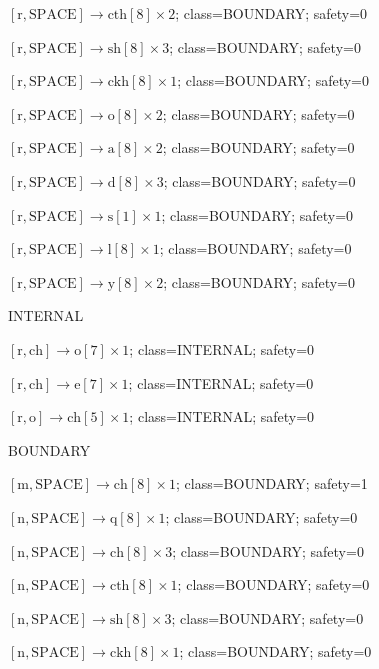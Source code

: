 \(\left[\mathrm{r}, \mathrm{SPACE}\right] \to \mathrm{cth}[8] \times 2\); class=BOUNDARY; safety=0\par
\(\left[\mathrm{r}, \mathrm{SPACE}\right] \to \mathrm{sh}[8] \times 3\); class=BOUNDARY; safety=0\par
\(\left[\mathrm{r}, \mathrm{SPACE}\right] \to \mathrm{ckh}[8] \times 1\); class=BOUNDARY; safety=0\par
\(\left[\mathrm{r}, \mathrm{SPACE}\right] \to \mathrm{o}[8] \times 2\); class=BOUNDARY; safety=0\par
\(\left[\mathrm{r}, \mathrm{SPACE}\right] \to \mathrm{a}[8] \times 2\); class=BOUNDARY; safety=0\par
\(\left[\mathrm{r}, \mathrm{SPACE}\right] \to \mathrm{d}[8] \times 3\); class=BOUNDARY; safety=0\par
\(\left[\mathrm{r}, \mathrm{SPACE}\right] \to \mathrm{s}[1] \times 1\); class=BOUNDARY; safety=0\par
\(\left[\mathrm{r}, \mathrm{SPACE}\right] \to \mathrm{l}[8] \times 1\); class=BOUNDARY; safety=0\par
\(\left[\mathrm{r}, \mathrm{SPACE}\right] \to \mathrm{y}[8] \times 2\); class=BOUNDARY; safety=0\par
INTERNAL\par
\(\left[\mathrm{r}, \mathrm{ch}\right] \to \mathrm{o}[7] \times 1\); class=INTERNAL; safety=0\par
\(\left[\mathrm{r}, \mathrm{ch}\right] \to \mathrm{e}[7] \times 1\); class=INTERNAL; safety=0\par
\(\left[\mathrm{r}, \mathrm{o}\right] \to \mathrm{ch}[5] \times 1\); class=INTERNAL; safety=0\par
BOUNDARY\par
\(\left[\mathrm{m}, \mathrm{SPACE}\right] \to \mathrm{ch}[8] \times 1\); class=BOUNDARY; safety=1\par
\(\left[\mathrm{n}, \mathrm{SPACE}\right] \to \mathrm{q}[8] \times 1\); class=BOUNDARY; safety=0\par
\(\left[\mathrm{n}, \mathrm{SPACE}\right] \to \mathrm{ch}[8] \times 3\); class=BOUNDARY; safety=0\par
\(\left[\mathrm{n}, \mathrm{SPACE}\right] \to \mathrm{cth}[8] \times 1\); class=BOUNDARY; safety=0\par
\(\left[\mathrm{n}, \mathrm{SPACE}\right] \to \mathrm{sh}[8] \times 3\); class=BOUNDARY; safety=0\par
\(\left[\mathrm{n}, \mathrm{SPACE}\right] \to \mathrm{ckh}[8] \times 1\); class=BOUNDARY; safety=0\par
